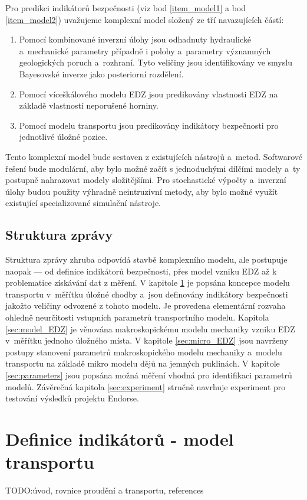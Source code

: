 \documentclass{article}
\def\todo#1{{TODO:\color{violet}#1}}
\begin{document}
Pro predikci indikátorů bezpečnosti (viz bod \ref{item_model1} 
a bod \ref{item_model2}) uvažujeme komplexní model složený ze tří navazujících částí: 
    \begin{enumerate}
    \item Pomocí kombinované inverzní úlohy jsou odhadnuty hydraulické a~mechanické
     parametry  případně i polohy a~parametry významných geologických poruch a~rozhraní. 
     Tyto veličiny jsou identifikovány ve smyslu Bayesovské inverze jako posteriorní rozdělení.
    \item Pomocí víceškálového modelu EDZ jsou predikovány vlastnosti EDZ na základě vlastností neporušené horniny.
    \item Pomocí modelu transportu jsou predikovány indikátory bezpečnosti pro jednotlivé úložné pozice.
    \end{enumerate}

Tento komplexní model bude sestaven z existujících nástrojů a~metod. Softwarové řešení bude modulární, aby bylo možné začít s
jednoduchými dílčími modely a~ty postupně nahrazovat modely složitějšími. Pro stochastické výpočty a~inverzní úlohy budou 
použity výhradně neintruzivní metody, aby bylo možné využít existující specializované simulační nástroje.

    
\subsection{Struktura zprávy}
Struktura zprávy zhruba odpovídá stavbě komplexního modelu, ale postupuje naopak --- od definice indikátorů bezpečnosti,
přes model vzniku EDZ až k problematice získávání dat z měření. 
V kapitole \ref{sec:transport} je popsána koncepce modelu transportu v~měřítku úložné chodby a~jsou
definovány indikátory bezpečnosti jakožto veličiny odvozené z tohoto modelu. Je provedena elementární rozvaha ohledně 
neurčitosti vstupních parametrů transportního modelu. Kapitola
\ref{sec:model_EDZ} je věnována makroskopickému modelu mechaniky vzniku EDZ v~měřítku jednoho úložného místa. 
V kapitole \ref{sec:micro_EDZ} jsou navrženy postupy stanovení parametrů makroskopického modelu mechaniky a~modelu transportu 
na základě mikro modelu dějů na jemných puklinách.
V kapitole \ref{sec:parameters} jsou popsána možná měření vhodná pro identifikaci 
parametrů modelů. Závěrečná kapitola \ref{sec:experiment} stručně navrhuje experiment pro testování výsledků projektu Endorse.


\section{Definice indikátorů - model transportu}
\label{sec:transport}
\todo{úvod, rovnice proudění a transportu, references}
\end{document}
